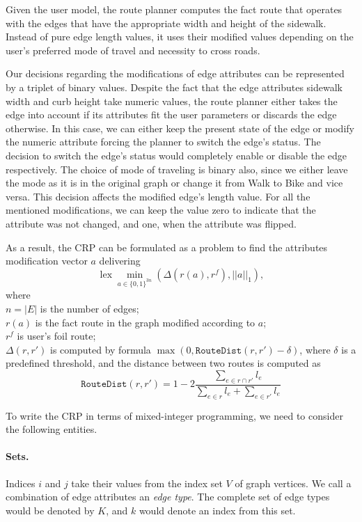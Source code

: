 \documentclass{article}
\DeclareMathOperator{\lex}{lex}
\begin{document}
Given the user model, the route planner computes the fact route that operates with the edges that have the appropriate width and height of the sidewalk.
Instead of pure edge length values, it uses their modified values depending on the user's preferred mode of travel and necessity to cross roads.

Our decisions regarding the modifications of edge attributes can be represented by a triplet of binary values.
Despite the fact that the edge attributes sidewalk width and curb height take numeric values, the route planner either takes the edge into account if its attributes fit the user parameters or discards the edge otherwise. 
In this case, we can either keep the present state of the edge or modify the numeric attribute forcing the planner to switch the edge's status.
The decision to switch the edge's status would completely enable or disable the edge respectively.
The choice of mode of traveling is binary also, since we either leave the mode as it is in the original graph or change it from Walk to Bike and vice versa.
This decision affects the modified edge's length value.
For all the mentioned modifications, we can keep the value zero to indicate that the attribute was not changed, and one, when the attribute was flipped. 

As a result, the CRP can be formulated as a problem to find the attributes modification vector $a$ delivering $$\lex\min_{a\in \{0,1\}^{3n}} \left(\Delta(r(a), r^f), ||a||_1\right),$$ where\\
$n = |E|$ is the number of edges;\\
$r(a)$ is the fact route in the graph modified according to $a$;\\
$r^f$ is user's foil route;\\
$\Delta(r,r')$ is computed by formula $\max(0, \mathtt{RouteDist}(r, r') - \delta)$, where $\delta$ is a predefined threshold, and the distance between two routes is computed as
$$
\mathtt{RouteDist}(r,r') = 1 - 2\frac{\sum_{e\in r\cap r'} l_e}{\sum_{e\in r}l_e + \sum_{e\in r'} l_e}
$$

To write the CRP in terms of mixed-integer programming, we need to consider the following entities.

\paragraph{Sets.} Indices $i$ and $j$ take their values from the index set $V$ of graph vertices.
We call a combination of edge attributes an \textit{edge type}. 
The complete set of edge types would be denoted by $K$, and $k$ would denote an index from this set.
\end{document}
